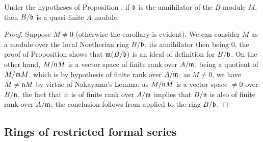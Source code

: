 \begin{cor}[7.4.5]
\label{0.7.4.5}
Under the hypotheses of Proposition , if
$\mathfrak{b}$ is the annihilator of the $B$-module $M$, then $B/\mathfrak{b}$ is a
quasi-finite $A$-module.
\end{cor}

\begin{proof}
\label{proof-0.7.4.5}
Suppose $M\neq 0$ (otherwise the corollary is evident). We can consider $M$ as a
module over the local Noetherian ring $B/\mathfrak{b}$; its annihilator then being
$0$, the proof of Proposition  shows that
$\mathfrak{m}(B/\mathfrak{b})$ is an ideal of definition for $B/\mathfrak{b}$.
On the other hand, $M/\mathfrak{n}M$ is a vector space of finite rank over
$A/\mathfrak{m}$, being a quotient of $M/\mathfrak{m}M$, which is by hypothesis of
finite rank over $A/\mathfrak{m}$; as $M\neq 0$, we have $M\neq\mathfrak{n}M$ by
virtue of Nakayama's Lemma; as $M/\mathfrak{n}M$ is a vector space $\neq 0$ over
$B/\mathfrak{n}$, the fact that it is of finite rank over $A/\mathfrak{m}$ implies
that $B/\mathfrak{n}$ is also of finite rank over $A/\mathfrak{m}$; the conclusion
follows from  applied to the ring $B/\mathfrak{b}$.
\end{proof}

\subsection{Rings of restricted formal series}
\label{subsection-rings-of-restricted-formal-series}

